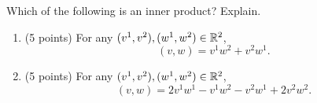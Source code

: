 \begin{exercise}
  \label{ex:hw07:coordinate-inner-products}
  Which of the following is an inner product? Explain.
  \begin{enumerate}[{1}.1.][2]
    \item (5 points) For any \((v^1,v^2),(w^1,w^2)\in\mathbb{R}^2\),
      \[
        (v,w)=v^1w^2+v^2w^1.
      \]
    \item (5 points) For any \((v^1,v^2),(w^1,w^2)\in\mathbb{R}^2\),
      \[
        (v,w)=2v^1w^1-v^1w^2-v^2w^1+2v^2w^2.
      \]
  \end{enumerate}
\end{exercise}
